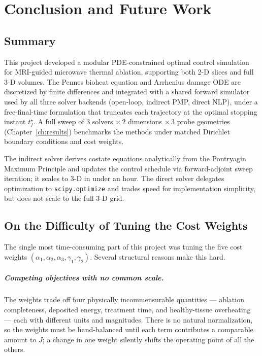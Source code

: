 \chapter{Conclusion and Future Work}
\label{ch:conclusion}

\section{Summary}

This project developed a modular PDE-constrained optimal control
simulation for MRI-guided microwave thermal ablation, supporting both
2-D slices and full 3-D volumes.
The Pennes bioheat equation and Arrhenius damage ODE are discretized
by finite differences and integrated with a shared forward simulator
used by all three solver backends (open-loop, indirect PMP, direct NLP),
under a free-final-time formulation that truncates each trajectory at the
optimal stopping instant $t_f^\star$.
A full sweep of $3$ solvers $\times\,2$ dimensions $\times\,3$ probe
geometries (Chapter~\ref{ch:results}) benchmarks the methods under
matched Dirichlet boundary conditions and cost weights.

The indirect solver derives costate equations analytically from the
Pontryagin Maximum Principle and updates the control schedule via
forward-adjoint sweep iteration; it scales to 3-D in under an hour.
The direct solver delegates optimization to \texttt{scipy.optimize}
and trades speed for implementation simplicity, but does not scale to the
full 3-D grid.

\section{On the Difficulty of Tuning the Cost Weights}
\label{sec:gain-tuning}

The single most time-consuming part of this project was tuning the five
cost weights $(\alpha_1, \alpha_2, \alpha_3, \gamma_1, \gamma_2)$. Several
structural reasons make this hard.

\paragraph{Competing objectives with no common scale.}
The weights trade off four physically incommensurable quantities ---
ablation completeness, deposited energy, treatment time, and healthy-tissue
overheating --- each with different units and magnitudes. There is no
natural normalization, so the weights must be hand-balanced until each term
contributes a comparable amount to $J$; a change in one weight silently
shifts the operating point of all the others.


